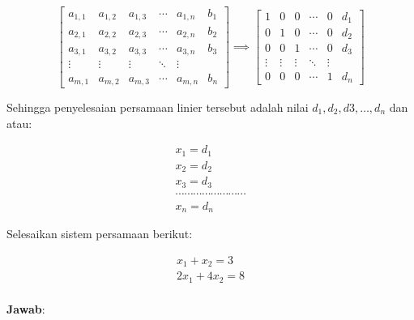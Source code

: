 \documentclass[]{book}
\theoremstyle{definition}
\theoremstyle{definition}
\theoremstyle{definition}
\theoremstyle{remark}
\let\BeginKnitrBlock\begin \let\EndKnitrBlock\end
\begin{document}
\begin{equation}
\begin{bmatrix}
     a_{1,1} & a_{1,2} & a_{1,3} &\cdots& a_{1,n} & b_1     \\[0.3em]
     a_{2,1} & a_{2,2} & a_{2,3} &\cdots& a_{2,n} & b_2     \\[0.3em]
     a_{3,1} & a_{3,2} & a_{3,3} &\cdots& a_{3,n} & b_3     \\[0.3em]
     \vdots  & \vdots  & \vdots &\ddots& \vdots             \\[0.3em]
     a_{m,1} & a_{m,2} & a_{m,3} &\cdots& a_{m,n} & b_n
     \end{bmatrix}
\implies
\begin{bmatrix}
     1       & 0       & 0       &\cdots& 0       & d_1     \\[0.3em]
     0       & 1       & 0       &\cdots& 0       & d_2     \\[0.3em]
     0       & 0       & 1       &\cdots& 0       & d_3     \\[0.3em]
     \vdots  & \vdots  & \vdots &\ddots& \vdots             \\[0.3em]
     0       & 0       & 0      &\cdots& 1        & d_n
     \end{bmatrix}
  \label{eq:gaussjordan}
\end{equation}

Sehingga penyelesaian persamaan linier tersebut adalah nilai \(d_1,d_2,d3,\dots,d_n\) dan atau:

\begin{equation}
\begin{matrix}
  x_1=d_1 \\
  x_2=d_2 \\
  x_3=d_3 \\
  \cdots\cdots\cdots\cdots\cdots\cdots\cdots\cdots       \\
  x_n=d_n
   \end{matrix}
  \label{eq:gaussjordansolution}
\end{equation}

\BeginKnitrBlock{example}
\protect\hypertarget{exm:gaussjordanexm}{}{\label{exm:gaussjordanexm} }Selesaikan sistem persamaan berikut:
\EndKnitrBlock{example}

\[
\begin{matrix}
  x_1+x_2=3 \\
  2x_1+4x_2=8 \\
\end{matrix}
\]

\textbf{Jawab}:
\end{document}
